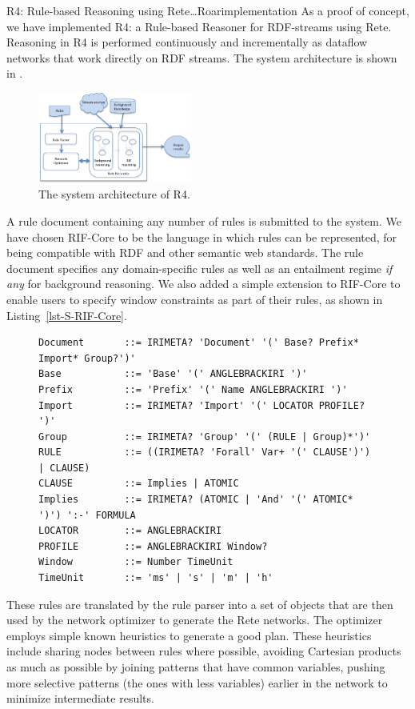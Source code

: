 \begin{nestedsection}{R4: Rule-based Reasoning using Rete\dots Roar}{implementation}
	As a proof of concept, we have implemented R4: a Rule-based Reasoner for RDF-streams using Rete.
	Reasoning in R4 is performed continuously and incrementally as dataflow networks that work directly on RDF streams.
	The system architecture is shown in .
	\begin{figure}[t]
		\centering
		\includegraphics[width=0.45\textwidth]{R4-architecture}
		\caption{The system architecture of R4.}
	\end{figure}

	A rule document containing any number of rules is submitted to the system.
	We have chosen RIF-Core to be the language in which rules can be represented, for being compatible with RDF and other semantic web standards.
	The rule document specifies any domain-specific rules as well as an entailment regime \emph{if any} for background reasoning.
	We also added a simple extension to RIF-Core to enable users to specify window constraints as part of their rules, as shown in Listing~\ref{lst-S-RIF-Core}.
	\begin{figure}
		\centering
		\begin{lstlisting}[caption=Streaming RIF-Core Grammar,label=lst-S-RIF-Core]
Document       ::= IRIMETA? 'Document' '(' Base? Prefix* Import* Group?')'
Base           ::= 'Base' '(' ANGLEBRACKIRI ')'
Prefix         ::= 'Prefix' '(' Name ANGLEBRACKIRI ')'
Import         ::= IRIMETA? 'Import' '(' LOCATOR PROFILE? ')'
Group          ::= IRIMETA? 'Group' '(' (RULE | Group)*')' 
RULE           ::= ((IRIMETA? 'Forall' Var+ '(' CLAUSE')') | CLAUSE)
CLAUSE         ::= Implies | ATOMIC
Implies        ::= IRIMETA? (ATOMIC | 'And' '(' ATOMIC* ')') ':-' FORMULA
LOCATOR        ::= ANGLEBRACKIRI
PROFILE        ::= ANGLEBRACKIRI Window?
Window         ::= Number TimeUnit
TimeUnit       ::= 'ms' | 's' | 'm' | 'h'
		\end{lstlisting}
	\end{figure}
	
	These rules are translated by the rule parser into a set of objects that are then used by the network optimizer to generate the Rete networks.
	The optimizer employs simple known heuristics to generate a good plan.
	These heuristics include sharing nodes between rules where possible, avoiding Cartesian products as much as possible by joining patterns that have common variables, pushing more selective patterns (the ones with less variables) earlier in the network to minimize intermediate results.
	

\end{nestedsection}

